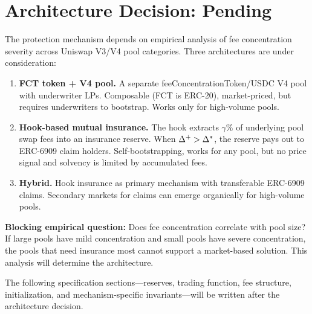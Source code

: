 \section{Architecture Decision: Pending}\label{sec:architecture-pending}

The protection mechanism depends on empirical analysis of fee concentration severity
across Uniswap V3/V4 pool categories. Three architectures are under consideration:

\begin{enumerate}
  \item \textbf{FCT token + V4 pool.} A separate feeConcentrationToken/USDC V4 pool with
    underwriter LPs. Composable (FCT is ERC-20), market-priced, but requires underwriters
    to bootstrap. Works only for high-volume pools.

  \item \textbf{Hook-based mutual insurance.} The hook extracts $\gamma\%$ of underlying pool
    swap fees into an insurance reserve. When $\Delta^{+} > \Delta^{*}$, the reserve pays out
    to ERC-6909 claim holders. Self-bootstrapping, works for any pool, but no price signal
    and solvency is limited by accumulated fees.

  \item \textbf{Hybrid.} Hook insurance as primary mechanism with transferable ERC-6909 claims.
    Secondary markets for claims can emerge organically for high-volume pools.
\end{enumerate}

\textbf{Blocking empirical question:} Does fee concentration correlate with pool size?
If large pools have mild concentration and small pools have severe concentration,
the pools that need insurance most cannot support a market-based solution.
This analysis will determine the architecture.

The following specification sections---reserves, trading function, fee structure,
initialization, and mechanism-specific invariants---will be written after the
architecture decision.
